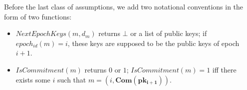 Before the last class of assumptions, we add two notational conventions in the form of two functions:
\begin{itemize}
\item $\mathit{NextEpochKeys}(m, d_m)$ returns $\bot$ or a list of public keys; if $\mathit{epoch_{id}}(m) = i$, 
these keys are supposed to be the public keys of epoch $i+1$. 
\item  $\mathit{IsCommitment}(m)$ returns $0$ or $1$; $\mathit{IsCommitment}(m) = 1$ iff  there exists some $i$ such that 
$m = (i, \mathbf{Com}(\mathbf{pk_{i+1}}))$.
\end{itemize}

